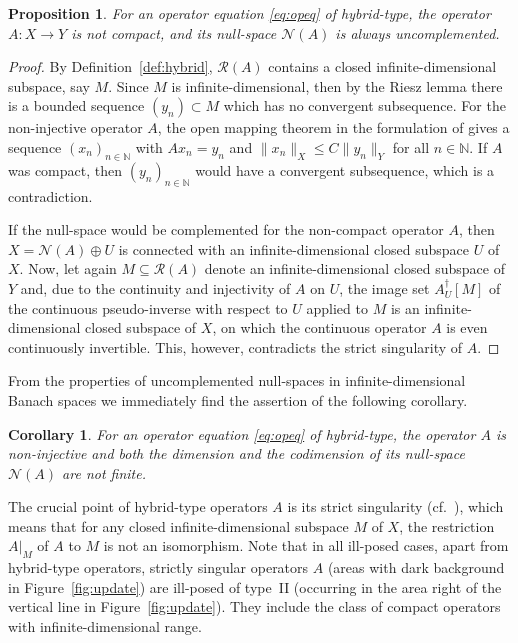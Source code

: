\documentclass[12pt,twoside,reqno]{amsart}
\newtheorem{proposition}[theorem]{Proposition}
\newtheorem{corollary}[theorem]{Corollary}
\theoremstyle{definition}
\numberwithin{equation}{section}
\begin{document}
\begin{proposition} \label{pro:hybridprop}
For an operator equation \eqref{eq:opeq} of hybrid-type, the operator $A: X \to Y$ is not compact, and its null-space $\mathcal{N}(A)$ is always uncomplemented.
\end{proposition}
\begin{proof}
By Definition~\ref{def:hybrid}, $\mathcal{R}(A)$ contains a closed infinite-dimensional subspace, say $M$. Since $M$ is infinite-dimensional, then by the Riesz lemma there is a bounded sequence $(y_n) \subset M$ which has no convergent subsequence. For the non-injective operator $A$, the
open mapping theorem in the formulation of \cite[Theorem~3, item 4]{Tao09b} gives a sequence $(x_n)_{n\in\mathbb{N}}$ with $A x_n = y_n$ and $\|x_n\|_X \leq C \|y_n\|_Y$ for all $n\in\mathbb{N}$. If $A$ was compact, then $(y_n)_{n\in\mathbb{N}}$ would have a convergent subsequence, which is a contradiction.

If the null-space would be complemented for the non-compact operator $A$, then $X=\mathcal{N}(A) \oplus U$ is connected with an infinite-dimensional closed subspace $U$ of $X$.
Now, let again $M \subseteq \mathcal{R}(A)$ denote an infinite-dimensional closed subspace of $Y$ and, due to the continuity and injectivity of $A$ on $U$, the image set $A_U^{\dagger}[M]$
of the continuous pseudo-inverse with respect to $U$ applied to $M$ is an infinite-dimensional closed subspace of $X$, on which the continuous operator $A$ is even continuously invertible.
This, however, contradicts the strict singularity of $A$.
\end{proof}

From the properties of uncomplemented null-spaces in infinite-dimensional Banach spaces we immediately find the assertion of the following corollary.

\begin{corollary} \label{cor:hybrid}
For an operator equation \eqref{eq:opeq} of hybrid-type, the operator $A$ is non-injective and both the dimension and the codimension of its null-space $\mathcal{N}(A)$ are not finite.
\end{corollary}

The crucial point of hybrid-type operators $A$ is its strict singularity (cf.~\cite[p.~284]{Kato58}), which means that for any closed infinite-dimensional subspace $M$ of $X$,
the restriction $A|_M$ of $A$ to $M$ is not an isomorphism. Note that in all ill-posed cases, apart from hybrid-type operators, strictly singular operators $A$ (areas with dark background in Figure~\ref{fig:update}) are ill-posed of type~II (occurring in the area right of the vertical line in Figure~\ref{fig:update}). They include the class
of compact operators with infinite-dimensional range.
\end{document}
